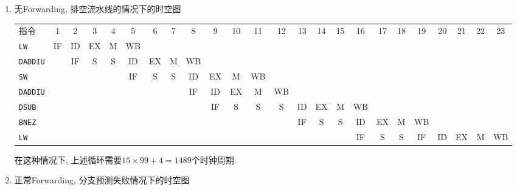 \begin{solve}
  \begin{enumerate}
  \item 无Forwarding, 排空流水线的情况下的时空图

    \begin{flushleft}
      \footnotesize
      \begin{tabular}{@{~}lc@{~}c@{~}c@{~}c@{~}c@{~}c@{~}c@{~}c@{~}c@{~}c@{~}c@{~}c@{~}c@{~}c@{~}c@{~}c@{~}c@{~}c@{~}c@{~}c@{~}c@{~}c@{~}c@{~}}
        指令
                        & 1  & 2  & 3  & 4  & 5  & 6  & 7  & 8  & 9  & 10 & 11 & 12 & 13 & 14 & 15 & 16 & 17 & 18 & 19 & 20 & 21 & 22 & 23 \\
        \texttt{LW}     & IF & ID & EX & M  & WB \\
        \texttt{DADDIU} &    & IF & S  & S  & ID & EX & M  & WB \\
        \texttt{SW}     &    &    &    &    & IF & S  & S  & ID & EX & M  & WB \\
        \texttt{DADDIU} &    &    &    &    &    &    &    & IF & ID & EX & M  & WB \\
        \texttt{DSUB}   &    &    &    &    &    &    &    &    & IF & S  & S  & S  & ID & EX & M  & WB \\
        \texttt{BNEZ}   &    &    &    &    &    &    &    &    &    &    &    &    & IF & S  & S  & ID & EX & M  & WB \\
        \texttt{LW}     &    &    &    &    &    &    &    &    &    &    &    &    &    &    &    & IF & S  & S  & IF & ID & EX & M  & WB \\
      \end{tabular}
    \end{flushleft}

    在这种情况下, 上述循环需要$15\times{}99 + 4 = 1489$个时钟周期.

    
  \item 正常Forwarding, 分支预测失败情况下的时空图


\end{enumerate}
\end{solve}
